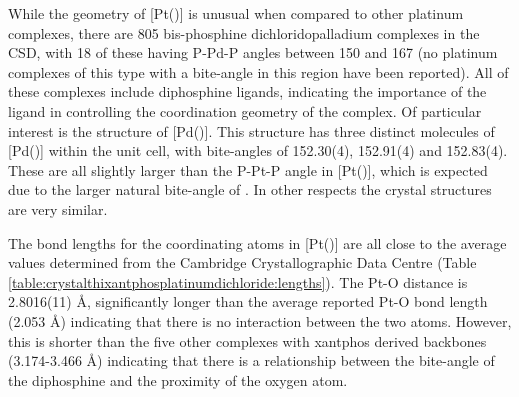 While the geometry of [Pt(\tButhixantphos)] is unusual when compared to other platinum complexes, there are 805 bis-phosphine dichloridopalladium complexes in the \gls{CSD}, with 18 of these having P-Pd-P angles between 150 and 167\degrees{} (no platinum complexes of this type with a bite-angle in this region have been reported).\cite{Allen2002}  All of these complexes include diphosphine ligands, indicating the importance of the ligand in controlling the coordination geometry of the complex.  Of particular interest is the structure of [Pd(\tBuxantphos)].\cite{Allen2002}  This structure has three distinct molecules of [Pd(\tBuxantphos)] within the unit cell, with bite-angles of 152.30(4), 152.91(4) and 152.83(4)\degrees.  These are all slightly larger than the P-Pt-P angle in [Pt(\tButhixantphos)], which is expected due to the larger natural bite-angle of \tBuxantphos{}.  In other respects the crystal structures are very similar.  

The bond lengths for the coordinating atoms in [Pt(\tButhixantphos)] are all close to the average values determined from the Cambridge Crystallographic Data Centre (Table \ref{table:crystalthixantphosplatinumdichloride:lengths}).  The Pt-O distance is 2.8016(11) \si{\angstrom}, significantly longer than the average reported Pt-O bond length (2.053 \si{\angstrom}) indicating that there is no interaction between the two atoms.  However, this is shorter than the five other complexes with xantphos derived backbones (3.174-3.466 \si{\angstrom}) indicating that there is a relationship between the bite-angle of the diphosphine and the proximity of the oxygen atom.  

